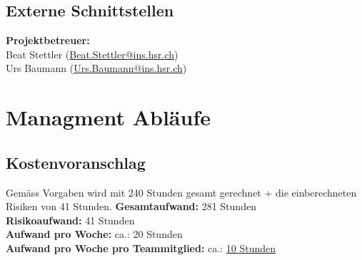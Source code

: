 \documentclass[11pt]{scrartcl}
\begin{document}

\subsection{Externe Schnittstellen}
\textbf{Projektbetreuer:} \\
Beat Stettler (\href{mailto:Beat.Stettler@ins.hsr.ch}{Beat.Stettler@ins.hsr.ch})  
\\
Urs Baumann (\href{mailto:Urs.Baumann@ins.hsr.ch}{Urs.Baumann@ins.hsr.ch})


\section{Managment Abläufe}

\subsection{Kostenvoranschlag}
Gemäss Vorgaben wird mit 240 Stunden gesamt gerechnet + die einberechneten 
Risiken von 41 Stunden.
\newline
\textbf{Gesamtaufwand:} 281 Stunden\\
\textbf{Risikoaufwand:} 41 Stunden\\
\textbf{Aufwand pro Woche:} ca.:  20 Stunden\\
\textbf{Aufwand pro Woche pro Teammitglied:} ca.: \uline{10 Stunden}
\end{document}
